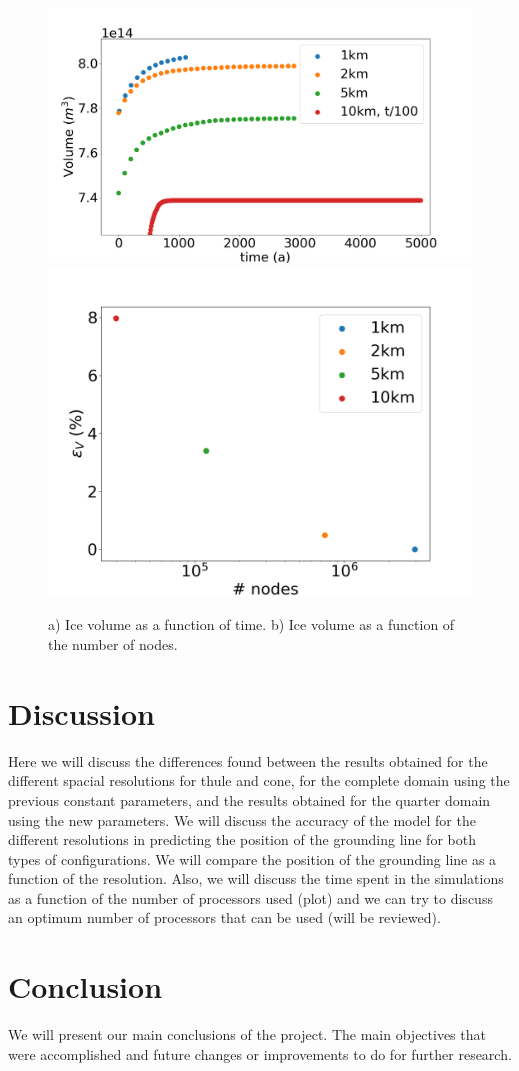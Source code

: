 \documentclass{article}
\begin{document}
	\begin{figure}[!h]
	\centering
	\includegraphics[width=0.45\linewidth]{../fig/Volume_CONE_full_all_res_vs_time.png}
	\includegraphics[width=0.45\linewidth]{../fig/Volume_CONE_full_all_res_vs_num_nodes.png}
	\caption{a) Ice volume as a function of time. b) Ice volume as a function of the number of nodes.}
	\label{Volume_CONE_all_res}
\end{figure}


\section{Discussion}
Here we will discuss the differences found between the results obtained for the different spacial resolutions for thule and cone, for the complete domain using the previous constant parameters, and the results obtained for the quarter domain using the new parameters. We will discuss the accuracy of the model for the different resolutions in predicting the position of the grounding line for both types of configurations. We will compare the position of the grounding line as a function of the resolution. 
Also, we will discuss the time spent in the simulations as a function of the number of processors used (plot) and we can try to discuss an optimum number of processors that can be used (will be reviewed).
\section{Conclusion}
We will present our main conclusions of the project. The main objectives that were accomplished and future changes or improvements to do for further research.
   \pagebreak

    
    
\end{document}
